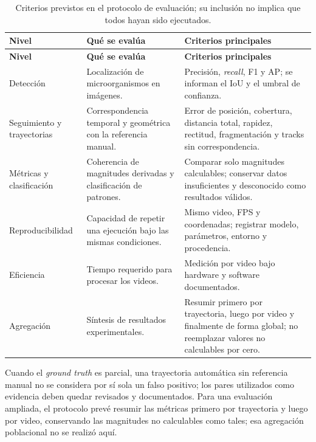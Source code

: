 \begingroup
\footnotesize
\renewcommand{\arraystretch}{1.12}
\setlength{\tabcolsep}{3.5pt}
\setlength{\LTleft}{0pt}
\setlength{\LTright}{\fill}
\begin{longtable}{@{}>{\raggedright\arraybackslash}p{}>{\raggedright\arraybackslash}p{}>{\raggedright\arraybackslash}p{}@{}}
\caption{Criterios previstos en el protocolo de evaluación; su inclusión no implica que todos hayan sido ejecutados.}
\label{tab:criterios-evaluacion}\\
\toprule
\textbf{Nivel} & \textbf{Qué se evalúa} & \textbf{Criterios principales} \\
\midrule
\endfirsthead
\toprule
\textbf{Nivel} & \textbf{Qué se evalúa} & \textbf{Criterios principales} \\
\midrule
\endhead
\bottomrule
\endfoot

Detección &
Localización de microorganismos en imágenes. &
Precisión, \textit{recall}, F1 y AP; se informan el IoU y el umbral de confianza. \\

Seguimiento y trayectorias &
Correspondencia temporal y geométrica con la referencia manual. &
Error de posición, cobertura, distancia total, rapidez, rectitud, fragmentación y tracks sin correspondencia. \\

Métricas y clasificación &
Coherencia de magnitudes derivadas y clasificación de patrones. &
Comparar solo magnitudes calculables; conservar datos insuficientes y desconocido como resultados válidos. \\

Reproducibilidad &
Capacidad de repetir una ejecución bajo las mismas condiciones. &
Mismo video, FPS y coordenadas; registrar modelo, parámetros, entorno y procedencia. \\

Eficiencia &
Tiempo requerido para procesar los videos. &
Medición por video bajo hardware y software documentados. \\

Agregación &
Síntesis de resultados experimentales. &
Resumir primero por trayectoria, luego por video y finalmente de forma global; no reemplazar valores no calculables por cero. \\

\end{longtable}
\endgroup

Cuando el \textit{ground truth} es parcial, una trayectoria automática sin referencia manual no se considera por sí sola un falso positivo; los pares utilizados como evidencia deben quedar revisados y documentados. Para una evaluación ampliada, el protocolo prevé resumir las métricas primero por trayectoria y luego por video, conservando las magnitudes no calculables como tales; esa agregación poblacional no se realizó aquí.

